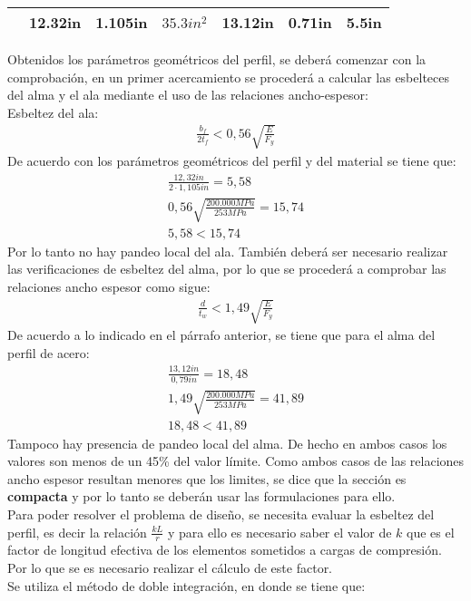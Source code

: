 \begin{example}
\begin{table}[h!]
\begin{tabular}{ccccccc}
                         & 12.32in & 1.105in & $35.3in^2$ & 13.12in & 0.71in & 5.5in \\ \hline
\end{tabular}
\end{table}
Obtenidos los parámetros geométricos del perfil, se deberá comenzar con la comprobación, en un primer acercamiento se procederá a calcular las esbelteces del alma y el ala mediante el uso de las relaciones ancho-espesor:\\
Esbeltez del ala:\\
\begin{align*}
\frac{b_{f}}{2t_f}<0,56\sqrt{\frac{E}{F_y}}
\end{align*}
De acuerdo con los parámetros geométricos del perfil y del material se tiene que:
\begin{align*}
    \frac{12,32in}{2\cdot 1,105in}=5,58\\
    0,56\sqrt{\frac{200.000MPa}{253MPa}}=15,74\\
    5,58<15,74
\end{align*}
Por lo tanto no hay pandeo local del ala.
También deberá ser necesario realizar las verificaciones de esbeltez del alma, por lo que se procederá a comprobar las relaciones ancho espesor como sigue:
\begin{align*}
    \frac{d}{t_w}<1,49\sqrt{\frac{E}{F_y}}
\end{align*}
De acuerdo a lo indicado en el párrafo anterior, se tiene que para el alma del perfil de acero:
\begin{gather*}
    \frac{13,12in}{0,79in}=18,48\\
    1,49\sqrt{\frac{200.000MPa}{253MPa}}=41,89\\
    18,48<41,89
\end{gather*}
Tampoco hay presencia de pandeo local del alma. De hecho en ambos casos los valores son menos de un 45\% del valor límite.
Como ambos casos de las relaciones ancho espesor resultan menores que los limites, se dice que la sección es \textbf{compacta} y por lo tanto se deberán usar las formulaciones para ello.\\
Para poder resolver el problema de diseño, se necesita evaluar la esbeltez del perfil, es decir la relación $\frac{kL}{r}$ y para ello es necesario saber el valor de $k$ que es el factor de longitud efectiva de los elementos sometidos a cargas de compresión. Por lo que se es necesario realizar el cálculo de este factor.\\
Se utiliza el método de doble integración, en donde se tiene que:\\

\end{example}

